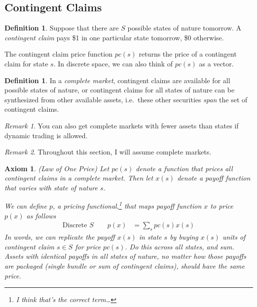 \documentclass[12pt]{article}
\theoremstyle{plain}
\newtheorem{ax}[thm]{Axiom}
\theoremstyle{definition}
\newtheorem{defn}[thm]{Definition}
\theoremstyle{remark}
\newtheorem*{rmk}{Remark}
\begin{document}
\subsection{Contingent Claims}
\begin{defn}
Suppose that there are $S$ possible states of nature tomorrow.  A
\emph{contingent claim} pays \$1 in one particular state tomorrow, \$0
otherwise.

The contingent claim price function $pc(s)$ returns the price of a
contingent claim for state $s$. In discrete space, we can also think of
$pc(s)$ as a vector.
\end{defn}

\begin{defn}
In a \emph{complete market}, contingent claims are available for
all possible states of nature, or contingent claims for all states of
nature can be synthesized from other available assets, i.e.\ these other
securities \emph{span} the set of contingent claims.
\end{defn}
\begin{rmk}
You can also get complete markets with fewer assets than states if
dynamic trading is allowed.
\end{rmk}

\begin{rmk}
Throughout this section, I will assume complete markets.
\end{rmk}


\begin{ax}{\emph{(Law of One Price)}}
Let $pc(s)$ denote a function that prices all contingent claims in a
complete market.  Then let $x(s)$ denote a payoff function that varies
with state of nature $s$.

We can define $p$, a pricing functional,\footnote{I think that's the
correct term\dots} that maps payoff function $x$ to price $p(x)$ as
follows
\begin{align}
  \text{Discrete $S$} \qquad
  p(x) &= \sum_s pc(s) x(s) \label{eq:contingentprice}
\end{align}
In words, we can replicate the payoff $x(s)$ in state $s$ by buying
$x(s)$ units of contingent claim $s\in S$ for price $pc(s)$. Do this
across all states, and sum. Assets with identical payoffs in all states
of nature, no matter how those payoffs are packaged (single bundle or
sum of contingent claims), should have the same price.
\end{ax}
\end{document}
